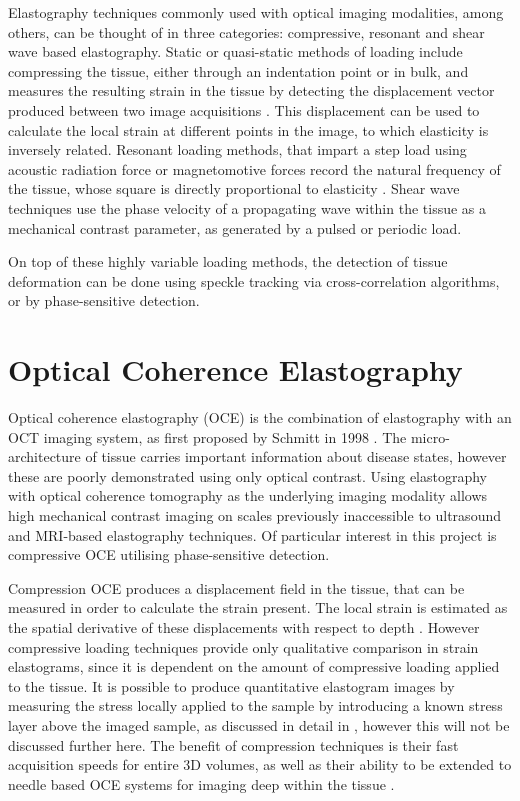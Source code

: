 Elastography techniques commonly used with optical imaging modalities, among others, can be thought of in three categories: compressive, resonant and shear wave based elastography. Static or quasi-static methods of loading include compressing the tissue, either through an indentation point or in bulk, and measures the resulting strain in the tissue by detecting the displacement vector produced between two image acquisitions \cite{kennedy_optical_2014}. This displacement can be used to calculate the local strain at different points in the image, to which elasticity is inversely related. Resonant loading methods, that impart a step load using acoustic radiation force or magnetomotive forces record the natural frequency of the tissue, whose square is directly proportional to elasticity \cite{kennedy_optical_2015}. Shear wave techniques use the phase velocity of a propagating wave within the tissue as a mechanical contrast parameter, as generated by a pulsed or periodic load. 

On top of these highly variable loading methods, the detection of tissue deformation can be done using speckle tracking via cross-correlation algorithms, or by phase-sensitive detection.

\section{Optical Coherence Elastography}
Optical coherence elastography (OCE) is the combination of elastography with an OCT imaging system, as first proposed by Schmitt in 1998 \cite{schmitt_oct_1998}. The micro-architecture of tissue carries important information about disease states, however these are poorly demonstrated using only optical contrast. Using elastography with optical coherence tomography as the underlying imaging modality allows high mechanical contrast imaging on scales previously inaccessible to ultrasound and MRI-based elastography techniques. Of particular interest in this project is compressive OCE utilising phase-sensitive detection. 

Compression OCE produces a displacement field in the tissue, that can be measured in order to calculate the strain present. The local strain is estimated as the spatial derivative of these displacements with respect to depth \cite{kennedy_review_2014}. However compressive loading techniques provide only qualitative comparison in strain elastograms, since it is dependent on the amount of compressive loading applied to the tissue. It is possible to produce quantitative elastogram images by measuring the stress locally applied to the sample by introducing a known stress layer above the imaged sample, as discussed in detail in \cite{kennedy_quantitative_2015}, however this will not be discussed further here. The benefit of compression techniques is their fast acquisition speeds for entire 3D volumes, as well as their ability to be extended to needle based OCE systems for imaging deep within the tissue \cite{kennedy_review_2014}. 

